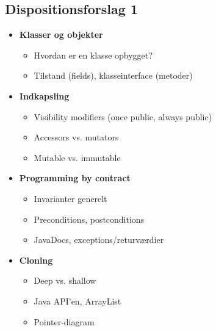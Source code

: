 \subsection{Dispositionsforslag 1}

\begin{itemize}
    \item \textbf{Klasser og objekter}
    \begin{itemize}
        \item Hvordan er en klasse opbygget?
        \item Tilstand (fields), klasseinterface (metoder)
    \end{itemize}
    
    \item \textbf{Indkapsling}
    \begin{itemize}
        \item Visibility modifiers (once public, always public)
        \item Accessors vs. mutators
        \item Mutable vs. immutable
    \end{itemize}
    
    \item \textbf{Programming by contract}
    \begin{itemize}
        \item Invarianter generelt
        \item Preconditions, postconditions
        \item JavaDocs, exceptions/returværdier
    \end{itemize}
    
    \item \textbf{Cloning}
    \begin{itemize}
        \item Deep vs. shallow
        \item Java API'en, ArrayList
        \item Pointer-diagram
    \end{itemize}
    
\end{itemize}
